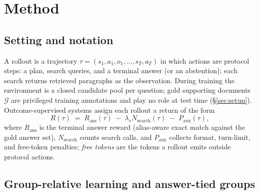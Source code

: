 
\section{Method}
\label{sec:method}
\label{sec:starvation}

\subsection{Setting and notation}
\label{sec:starve-setting}

A rollout is a trajectory
$\tau=(s_1,a_1,o_1,\ldots,s_T,a_T)$ in which actions are protocol steps:
a plan, search queries, and a terminal answer (or an abstention); each
search returns retrieved paragraphs as the observation. During training
the environment is a closed candidate pool per question; gold supporting
documents $\mathcal{G}$ are privileged training annotations and play no
role at test time (\S\ref{sec:setup}). Outcome-supervised systems assign
each rollout a return of the form
\begin{equation}
R(\tau) \;=\; R_{\mathrm{ans}}(\tau)
\;-\; \lambda_{s} N_{\mathrm{search}}(\tau) \;-\; P_{\mathrm{aux}}(\tau),
\label{eq:base-reward}
\end{equation}
where $R_{\mathrm{ans}}$ is the terminal answer reward (alias-aware exact
match against the gold answer set), $N_{\mathrm{search}}$ counts search
calls, and $P_{\mathrm{aux}}$ collects format, turn-limit, and free-token
penalties; \emph{free tokens} are the tokens a rollout emits outside
protocol actions.

\subsection{Group-relative learning and answer-tied groups}
\label{sec:starve-ties}

